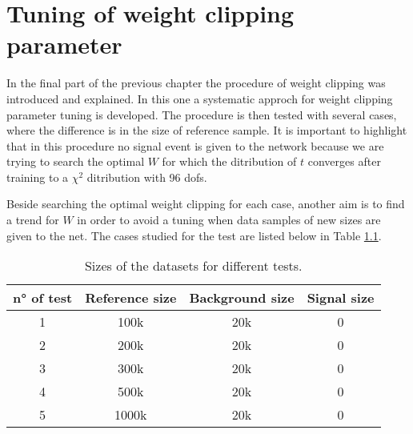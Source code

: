 \chapter{Tuning of weight clipping parameter}

In the final part of the previous chapter the procedure of weight clipping was introduced and explained. In this one a systematic approch for weight clipping parameter tuning is developed. The procedure is then tested with several cases, where the difference is in the size of reference sample. It is important to highlight that in this procedure no signal event is given to the network because we are trying to search the optimal $W$ for which the ditribution of $t$ converges after training to a $\chi^2$ ditribution with 96 dofs.

Beside searching the optimal weight clipping for each case, another aim is to find a trend for $W$ in order to avoid a tuning when data samples of new sizes are given to the net. The cases studied for the test are listed below in Table \ref{tab:W_CLIP_TEST_SIZES}.

\begin{table}[H]
	\centering
	\begin{tabular}{c c c c}
		\toprule
		n° of test	&	Reference size	&	Background size	&	Signal size	\\
		\midrule
		1			&	100k			&	20k				&	0			\\
		2			&	200k			&	20k				&	0			\\
		3			&	300k			&	20k				&	0			\\
		4			&	500k			&	20k				&	0			\\
		5			&	1000k			&	20k				&	0			\\
		\bottomrule
	\end{tabular}
	\caption{Sizes of the datasets for different tests.}
	\label{tab:W_CLIP_TEST_SIZES}
\end{table}





